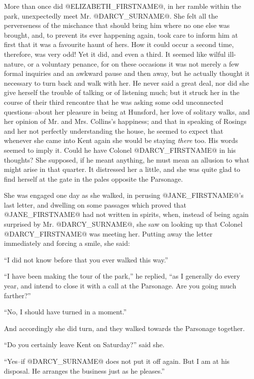 More than once did @ELIZABETH_FIRSTNAME@, in her ramble within the park,
unexpectedly meet Mr. @DARCY_SURNAME@. She felt all the perverseness of the
mischance that should bring him where no one else was brought, and, to
prevent its ever happening again, took care to inform him at first that
it was a favourite haunt of hers. How it could occur a second time,
therefore, was very odd! Yet it did, and even a third. It seemed like
wilful ill-nature, or a voluntary penance, for on these occasions it was
not merely a few formal inquiries and an awkward pause and then away,
but he actually thought it necessary to turn back and walk with her. He
never said a great deal, nor did she give herself the trouble of talking
or of listening much; but it struck her in the course of their third
rencontre that he was asking some odd unconnected questions--about
her pleasure in being at Hunsford, her love of solitary walks, and her
opinion of Mr. and Mrs. Collins's happiness; and that in speaking of
Rosings and her not perfectly understanding the house, he seemed to
expect that whenever she came into Kent again she would be staying
\textit{there} too. His words seemed to imply it. Could he have Colonel
@DARCY_FIRSTNAME@ in his thoughts? She supposed, if he meant anything, he must
mean an allusion to what might arise in that quarter. It distressed
her a little, and she was quite glad to find herself at the gate in the
pales opposite the Parsonage.

She was engaged one day as she walked, in perusing @JANE_FIRSTNAME@'s last letter,
and dwelling on some passages which proved that @JANE_FIRSTNAME@ had not written in
spirits, when, instead of being again surprised by Mr. @DARCY_SURNAME@, she saw
on looking up that Colonel @DARCY_FIRSTNAME@ was meeting her. Putting away the
letter immediately and forcing a smile, she said:

``I did not know before that you ever walked this way.''

``I have been making the tour of the park,'' he replied, ``as I generally
do every year, and intend to close it with a call at the Parsonage. Are
you going much farther?''

``No, I should have turned in a moment.''

And accordingly she did turn, and they walked towards the Parsonage
together.

``Do you certainly leave Kent on Saturday?'' said she.

``Yes--if @DARCY_SURNAME@ does not put it off again. But I am at his disposal. He
arranges the business just as he pleases.''


